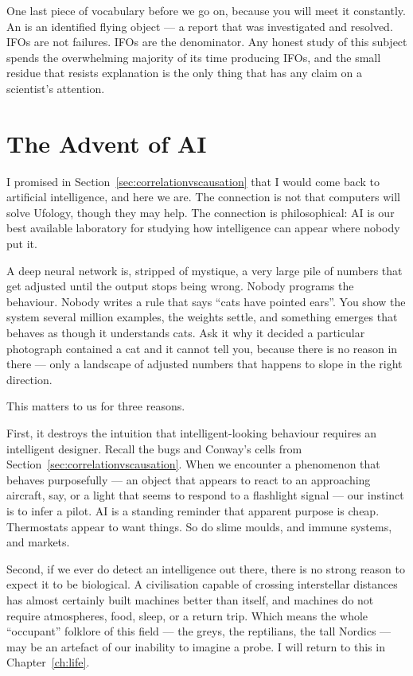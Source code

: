 One last piece of vocabulary before we go on, because you will meet it constantly. An
 is an identified flying object --- a report that was investigated and
resolved. IFOs are not failures. IFOs are the denominator. Any honest study of this
subject spends the overwhelming majority of its time producing IFOs, and the small
residue that resists explanation is the only thing that has any claim on a scientist's
attention.

\section{The Advent of AI}\label{sec:ai}

I promised in Section~\ref{sec:correlationvscausation} that I would come back to artificial intelligence, and here
we are. The connection is not that computers will solve Ufology, though they may help.
The connection is philosophical: AI is our best available laboratory for studying how
intelligence can appear where nobody put it.

A deep neural network is, stripped of mystique, a very large pile of numbers that get
adjusted until the output stops being wrong. Nobody programs the behaviour. Nobody
writes a rule that says ``cats have pointed ears''. You show the system several million
examples, the weights settle, and something emerges that behaves as though it
understands cats. Ask it why it decided a particular photograph contained a cat and it
cannot tell you, because there is no reason in there --- only a landscape of adjusted
numbers that happens to slope in the right direction.

This matters to us for three reasons.

First, it destroys the intuition that intelligent-looking behaviour requires an
intelligent designer. Recall the bugs and Conway's cells from Section~\ref{sec:correlationvscausation}. When we
encounter a phenomenon that behaves purposefully --- an object that appears to react to
an approaching aircraft, say, or a light that seems to respond to a flashlight signal
--- our instinct is to infer a pilot. AI is a standing reminder that apparent purpose is
cheap. Thermostats appear to want things. So do slime moulds, and immune systems, and
markets.

Second, if we ever do detect an intelligence out there, there is no strong reason to
expect it to be biological. A civilisation capable of crossing interstellar distances
has almost certainly built machines better than itself, and machines do not require
atmospheres, food, sleep, or a return trip. Which means the whole ``occupant'' folklore
of this field --- the greys, the reptilians, the tall Nordics --- may be an artefact of
our inability to imagine a probe. I will return to this in Chapter~\ref{ch:life}.

